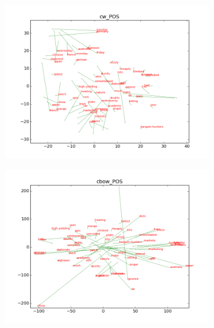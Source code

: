 \begin{figure}[h]
\caption{updated vs. no-updated word representations for POS}
\centering
\begin{subfigure}{6cm}
	\centering
    \includegraphics[scale=0.3]{plots/vectorField/cw_POS.png}    	
	\label{fig:bestpos}
	\subcaption{}	
\end{subfigure}
\begin{subfigure}{6cm}
	\centering
    \includegraphics[scale=0.3]{plots/vectorField/cbow_POS.png}
	\label{fig:bestchunking}
	\subcaption{}	
\end{subfigure}
\begin{subfigure}{6cm}
	\centering

\end{subfigure}
\end{figure}
